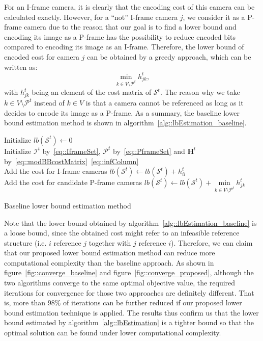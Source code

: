 For an I-frame camera, it is clearly that the encoding cost of this camera can be calculated exactly.
However, for a ``not'' I-frame camera $j$, we consider it as a P-frame camera due to the reason that our goal is to find a lower bound and encoding its image as a P-frame has the possibility to reduce encoded bits compared to encoding its image as an I-frame.
Therefore, the lower bound of encoded cost for camera $j$ can be obtained by a greedy approach, which can be written as:
\begin{equation}
\underset{k \in V \setminus \mathcal{P}^t}{\min} h_{jk}^t,
\label{eq::lbGreedy}
\end{equation}
with $h_{jk}^t$ being an element of the cost matrix of $\mathcal{S}^t$.
The reason why we take $k \in V \setminus \mathcal{P}^t$ instead of $k \in V$ is that a camera cannot be referenced as long as it decides to encode its image as a P-frame.
As a summary, the baseline lower bound estimation method is shown in algorithm~\ref{alg::lbEstimation_baseline}.
%
\IncMargin{1em}
\begin{algorithm}[]
 \SetAlgoLined
 \BlankLine
 Initialize $lb(\mathcal{S}^t) \gets 0$\\
 Initialize $\mathcal{I}^t$ by~\eqref{eq::IframeSet}, $\mathcal{P}^t$ by~\eqref{eq::PframeSet} and $\mathbf{H}^t$ by~\eqref{eq::modBBcostMatrix}~\eqref{eq::infColumn} \\
 {
 	Add the cost for I-frame cameras $lb(\mathcal{S}^t) \gets lb(\mathcal{S}^t) + h_{ii}^t$ \\
 }
 {
 	Add the cost for candidate P-frame cameras $lb(\mathcal{S}^t) \gets lb(\mathcal{S}^t) + \underset{k \in V \setminus \mathcal{P}^t}{\min} h_{jk}^t$ \\
 }
 \caption{\label{alg::lbEstimation_baseline}Baseline lower bound estimation method}
\end{algorithm}
\DecMargin{1em}
%

Note that the lower bound obtained by algorithm~\ref{alg::lbEstimation_baseline} is a loose bound, since the obtained cost might refer to an infeasible reference structure (i.e. $i$ reference $j$ together with $j$ reference $i$).
Therefore, we can claim that our proposed lower bound estimation method can reduce more computational complexity than the baseline approach.
As shown in figure~\ref{fig::converge_baseline} and figure~\ref{fig::converge_proposed}, although the two algorithms converge to the same optimal objective value, the required iterations for convergence for those two approaches are definitely different.
That is, more than $98\%$ of iterations can be further reduced if our proposed lower bound estimation technique is applied.
The results thus confirm us that the lower bound estimated by algorithm~\ref{alg::lbEstimation} is a tighter bound so that the optimal solution can be found under lower computational complexity.

